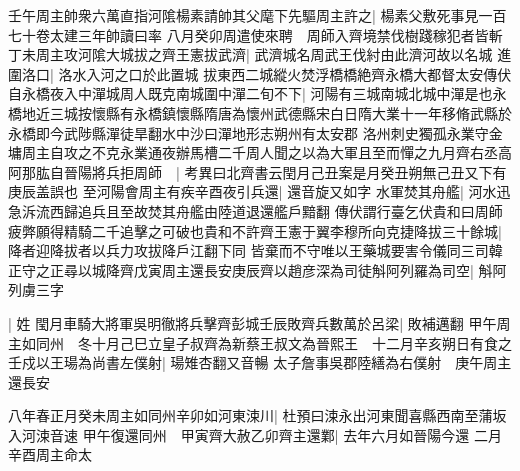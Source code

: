 壬午周主帥衆六萬直指河隂楊素請帥其父麾下先驅周主許之|{
	楊素父敷死事見一百七十卷太建三年帥讀曰率}
八月癸卯周遣使來聘　周師入齊境禁伐樹踐稼犯者皆斬丁未周主攻河隂大城拔之齊王憲拔武濟|{
	武濟城名周武王伐紂由此濟河故以名城}
進圍洛口|{
	洛水入河之口於此置城}
拔東西二城縱火焚浮橋橋絶齊永橋大都督太安傳伏自永橋夜入中潬城周人既克南城圍中潬二旬不下|{
	河陽有三城南城北城中潬是也永橋地近三城按懷縣有永橋鎮懷縣隋唐為懷州武德縣宋白日隋大業十一年移脩武縣於永橋即今武陟縣潬徒旱翻水中沙曰潬地形志朔州有太安郡}
洛州刺史獨孤永業守金墉周主自攻之不克永業通夜辦馬槽二千周人聞之以為大軍且至而憚之九月齊右丞高阿那肱自晉陽將兵拒周師　|{
	考異曰北齊書云閏月己丑案是月癸丑朔無己丑又下有庚辰盖誤也}
至河陽會周主有疾辛酉夜引兵還|{
	還音旋又如字}
水軍焚其舟艦|{
	河水迅急泝流西歸追兵且至故焚其舟艦由陸道退還艦戶黯翻}
傳伏謂行臺乞伏貴和曰周師疲弊願得精騎二千追擊之可破也貴和不許齊王憲于翼李穆所向克捷降拔三十餘城|{
	降者迎降拔者以兵力攻拔降戶江翻下同}
皆棄而不守唯以王藥城要害令儀同三司韓正守之正尋以城降齊戊寅周主還長安庚辰齊以趙彦深為司徒斛阿列羅為司空|{
	斛阿列虜三字}


|{
	姓}
閠月車騎大將軍吳明徹將兵擊齊彭城壬辰敗齊兵數萬於呂梁|{
	敗補邁翻}
甲午周主如同州　冬十月己巳立皇子叔齊為新蔡王叔文為晉熙王　十二月辛亥朔日有食之　壬戍以王瑒為尚書左僕射|{
	瑒雉杏翻又音暢}
太子詹事吳郡陸繕為右僕射　庚午周主還長安

八年春正月癸未周主如同州辛卯如河東涑川|{
	杜預曰涑永出河東聞喜縣西南至蒲坂入河涑音速}
甲午復還同州　甲寅齊大赦乙卯齊主還鄴|{
	去年六月如晉陽今還}
二月辛酉周主命太

